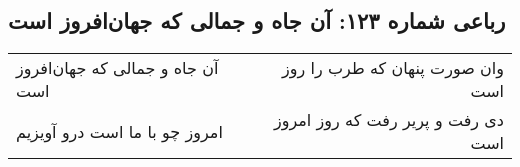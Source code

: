 \begin{center}
\section*{رباعی شماره ۱۲۳: آن جاه و جمالی که جهان‌افروز است}
\label{sec:0123}
\begin{longtable}{l p{0.5cm} r}
آن جاه و جمالی که جهان‌افروز است
&&
وان صورت پنهان که طرب را روز است
\\
امروز چو با ما است درو آویزیم
&&
دی رفت و پریر رفت که روز امروز است
\\
\end{longtable}
\end{center}
